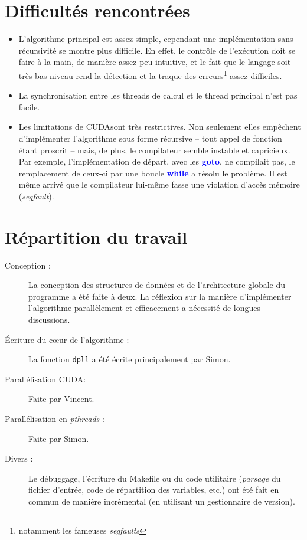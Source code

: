 \documentclass{article}
\newcommand{\keyword}[1]{\textbf{\textcolor{blue}{#1}}}
\newcommand{\code}[1]{\texttt{{#1}}}
\newcommand{\cuda}{\textsc{CUDA}}
\begin{document}
\section{Difficultés rencontrées}
\begin{itemize}
    \item L'algorithme principal est assez simple, cependant une implémentation sans récursivité se montre plus difficile. En effet, le contrôle de l'exécution doit se faire à la main, de manière assez peu intuitive, et le fait que le langage soit très bas niveau rend la détection et la traque des erreurs\footnote{notamment les fameuses \emph{segfaults}} assez difficiles.
    \item La synchronisation entre les threads de calcul et le thread principal n'est pas facile.
    \item Les limitations de \cuda sont très restrictives. Non seulement elles empêchent d'implémenter l'algorithme sous forme récursive -- tout appel de fonction étant proscrit -- mais, de plus, le compilateur semble instable et capricieux. Par exemple, l'implémentation de départ, avec les \keyword{goto}, ne compilait pas, le remplacement de ceux-ci par une boucle \keyword{while} a résolu le problème. Il est même arrivé que le compilateur lui-même fasse une violation d'accès mémoire (\emph{segfault}).
\end{itemize}

\section{Répartition du travail}
\begin{description}
    \item[Conception :] La conception des structures de données et de l'architecture globale du programme a été faite à deux. La réflexion sur la manière d'implémenter l'algorithme parallèlement et efficacement a nécessité de longues discussions.
    \item[Écriture du cœur de l'algorithme :] La fonction \code{dpll} a été écrite principalement par Simon.
    \item[Parallélisation \cuda :] Faite par Vincent.
    \item[Parallélisation en \emph{pthreads} :] Faite par Simon.
    \item[Divers :] Le débuggage, l'écriture du Makefile ou du code utilitaire (\emph{parsage} du fichier d'entrée, code de répartition des variables, etc.) ont été fait en commun de manière incrémental (en utilisant un gestionnaire de version).
\end{description}
\end{document}
